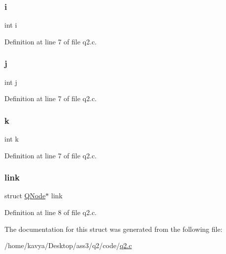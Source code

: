\subsubsection{\texorpdfstring{i}{i}}
{\footnotesize\ttfamily int i}



Definition at line 7 of file q2.\+c.

\mbox{\label{struct_q_node_a37d972ae0b47b9099e30983131d31916}} 
\subsubsection{\texorpdfstring{j}{j}}
{\footnotesize\ttfamily int j}



Definition at line 7 of file q2.\+c.

\mbox{\label{struct_q_node_ab66ed8e0098c0a86b458672a55a9cca9}} 
\subsubsection{\texorpdfstring{k}{k}}
{\footnotesize\ttfamily int k}



Definition at line 7 of file q2.\+c.

\mbox{\label{struct_q_node_aeb974434dabad67698cafa3278f141a0}} 
\subsubsection{\texorpdfstring{link}{link}}
{\footnotesize\ttfamily struct \hyperlink{struct_q_node}{Q\+Node}$\ast$ link}



Definition at line 8 of file q2.\+c.



The documentation for this struct was generated from the following file\+:\begin{DoxyCompactItemize}
\item 
/home/kavya/\+Desktop/ass3/q2/code/\hyperlink{q2_8c}{q2.\+c}\end{DoxyCompactItemize}
